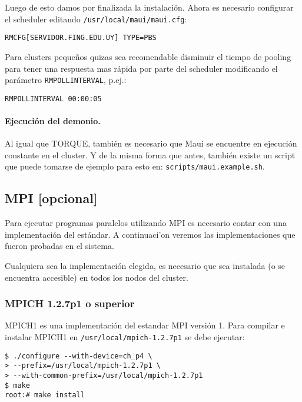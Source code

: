 \documentclass[a4paper,10pt,spanish]{article}
\begin{document}
Luego de esto damos por finalizada la instalaci\'{o}n. Ahora es necesario configurar el scheduler editando \mbox{\texttt{/usr/local/maui/maui.cfg}}:

\begin{verbatim}
RMCFG[SERVIDOR.FING.EDU.UY] TYPE=PBS
\end{verbatim}

Para clusters peque\~{n}os quizas sea recomendable disminuir el tiempo de pooling para tener una respuesta mas r\'{a}pida por parte del scheduler modificando el par\'{a}metro \texttt{RMPOLLINTERVAL}, p.ej.:

\begin{verbatim}
RMPOLLINTERVAL 00:00:05
\end{verbatim}

\paragraph{Ejecuci\'{o}n del demonio.}

Al igual que TORQUE, tambi\'{e}n es necesario que Maui se encuentre en ejecuci\'{o}n constante en el cluster. Y de la misma forma que antes, tambi\'{e}n existe un script que puede tomarse de ejemplo para esto en: \mbox{\texttt{scripts/maui.example.sh}}.

\subsection{MPI \small{[opcional]}}

Para ejecutar programas paralelos utilizando MPI es necesario contar con una implementaci\'{o}n del est\'{a}ndar. A continuaci'{o}n veremos las implementaciones que fueron probadas en el sistema.

Cualquiera sea la implementaci\'{o}n elegida, es necesario que sea instalada (o se encuentra accesible) en todos los nodos del cluster.

\subsubsection{MPICH 1.2.7p1 o superior}

MPICH1\cite{mpich1} es una implementaci\'{o}n del estandar MPI versi\'{o}n 1. Para compilar e instalar MPICH1 en \mbox{\texttt{/usr/local/mpich-1.2.7p1}} se debe ejecutar:

\begin{verbatim}
$ ./configure --with-device=ch_p4 \
> --prefix=/usr/local/mpich-1.2.7p1 \
> --with-common-prefix=/usr/local/mpich-1.2.7p1 
$ make 
root:# make install
\end{verbatim}
\end{document}
